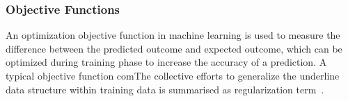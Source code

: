 \subsubsection{Objective Functions}
An optimization objective function in machine learning is used to measure the difference between the predicted outcome and expected outcome, which can be optimized during training phase to increase the accuracy of a prediction. A typical objective function comThe collective efforts to generalize the underline data structure within training data is summarised as regularization term~\cite{goodfellow_2015}.  